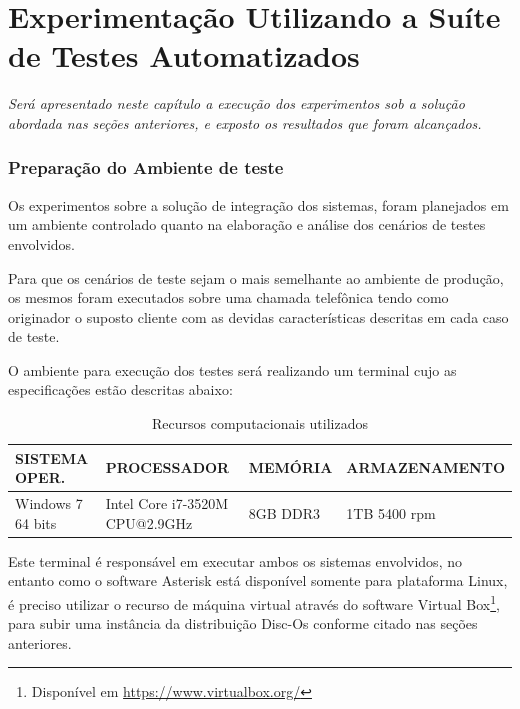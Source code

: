 \chapter[Experimentação Utilizando a Suíte de Testes Automatizados]{\textbf{E}xperimentação \textbf{U}tilizando a \textbf{S}uíte de \textbf{T}estes \textbf{A}utomatizados}

\textit{Será apresentado neste capítulo a execução dos experimentos sob a solução abordada nas seções anteriores, e exposto os resultados que foram alcançados.}


\subsection{Preparação do Ambiente de teste}

Os experimentos sobre a solução de integração dos sistemas, foram planejados em um ambiente controlado quanto na elaboração e análise dos cenários de testes envolvidos. 

Para que os cenários de teste sejam o mais semelhante ao ambiente de produção, os mesmos foram executados sobre uma chamada telefônica tendo como originador o suposto cliente com as devidas características descritas em cada caso de teste. 

O ambiente para execução dos testes será realizando um terminal cujo as especificações estão descritas abaixo:

\begin{table}[htb]
	\footnotesize
	\caption{Recursos computacionais utilizados}
	\label{tabela:recursosUtilizados}
	\begin{tabular}{|p{3.5cm}|p{3cm}|p{2cm}|p{4cm}|} \hline
		\textbf{SISTEMA OPER.} 	& \textbf{PROCESSADOR} 				& \textbf{MEMÓRIA} 	& \textbf{ARMAZENAMENTO}  \\ \hline
		Windows 7 64 bits 		& Intel Core i7-3520M CPU@2.9GHz 	& 8GB DDR3			& 1TB 5400 rpm \\ \hline
	\end{tabular}
\end{table}

Este terminal é responsável em executar ambos os sistemas envolvidos, no entanto como o software Asterisk está disponível somente para plataforma Linux, é preciso utilizar o recurso de máquina virtual através do software Virtual Box\footnote{Disponível em \url{https://www.virtualbox.org/}}, para subir uma instância da distribuição Disc-Os conforme citado nas seções anteriores.
 
